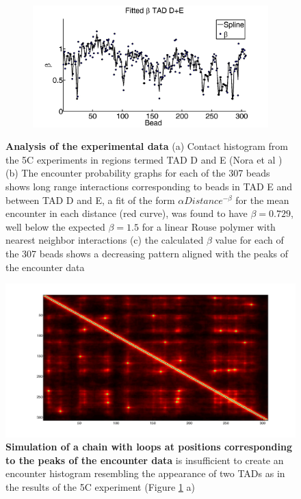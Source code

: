 \documentclass[12pt]{article}
\begin{document}
\begin{figure}[H]
\begin{subfigure}[b]{0.1\textwidth}
\includegraphics[scale=0.16]{fittedExpValuesWithSplineAverageTADDAndE}
\caption{}
\end{subfigure}

\caption{\textbf{Analysis of the experimental data} (a) Contact histogram from the 5C experiments in regions termed TAD D and E (Nora et al \cite{Nora2012}) (b) The encounter probability graphs for each of the 307 beads shows long range interactions corresponding to beads in TAD E and between TAD D and E, a fit of the form $\alpha Distance ^{-\beta}$ for the mean encounter in each distance (red curve), was found to have $\beta=0.729$, well below the expected $\beta=1.5$ for a linear Rouse polymer with nearest neighbor interactions (c) the calculated $\beta$ value for each of the 307 beads shows a decreasing pattern aligned with the peaks of the encounter data}
\label{figure_TADDAndENoraEtAl2012}
\end{figure}


\begin{figure}[H]
\includegraphics[scale=0.2]{meanEncounterMatrixOfSimulatingTADEandDWithLoops}
\caption{\textbf{Simulation of a chain with loops at positions corresponding to the peaks of the encounter data} is insufficient to create an encounter histogram resembling the appearance of two TADs as in the results of the 5C experiment (Figure \ref{figure_TADDAndENoraEtAl2012} a) }
\label{figure_encounterProbabilityPeaksOfTheEncounterData}
\end{figure}
\end{document}
